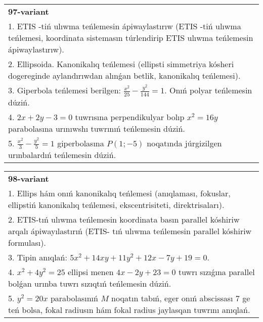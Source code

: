 \documentclass{article}
\begin{document}
\begin{tabular}{m{17cm}}
\textbf{97-variant}\\
1. ETIS -tiń ulıwma teńlemesin ápiwaylastırıw (ETIS -tiń ulıwma teńlemesi, koordinata sistemasın túrlendirip ETIS ulıwma teńlemesin ápiwaylastırıw).\\

2. Ellipsoida. Kanonikalıq teńlemesi (ellipsti simmetriya kósheri dogereginde aylandırıwdan alınǵan betlik, kanonikalıq teńlemesi).\\

3. Giperbola teńlemesi berilgen: $\frac{x^{2}}{25}-\frac{y^{2}}{144}=1$. Onıń polyar teńlemesin dúziń.\\

4. $2x + 2y - 3 = 0$ tuwrısına perpendikulyar bolıp $x^{2} = 16y$ parabolasına urınıwshı tuwrınıń teńlemesin dúziń.  \\

5. $\frac{x^{2}}{3} - \frac{y^{2}}{5} = 1$ giperbolasına $P(1; - 5)$ noqatında júrgizilgen urınbalardıń teńlemesin dúziń.
\end{tabular}
\vspace{1cm}


\begin{tabular}{m{17cm}}
\textbf{98-variant}\\
1. Ellips hám onıń kanonikalıq teńlemesi (anıqlaması, fokuslar, ellipstiń kanonikalıq teńlemesi, ekscentrisiteti, direktrisaları).\\

2. ETIS-tıń ulıwma teńlemesin koordinata basın parallel kóshiriw arqalı ápiwayılastırıń (ETIS- tıń ulıwma teńlemesin parallel kóshiriw formulası).\\

3. Tipin anıqlań: $5 x^{2}+14 xy+11 y^{2}+12 x-7 y+19=0$.\\

4. $x^{2} + 4y^{2} = 25$ ellipsi menen $4x - 2y + 23 = 0$ tuwrı sızıǵına parallel bolǵan urınba tuwrı sızıqtıń teńlemesin dúziń.  \\

5. $y^{2} = 20x$ parabolasınıń $M$ noqatın tabıń, eger onıń abscissası 7 ge teń bolsa, fokal radiusın hám fokal radius jaylasqan tuwrını anıqlań.
\end{tabular}
\vspace{1cm}
\end{document}

